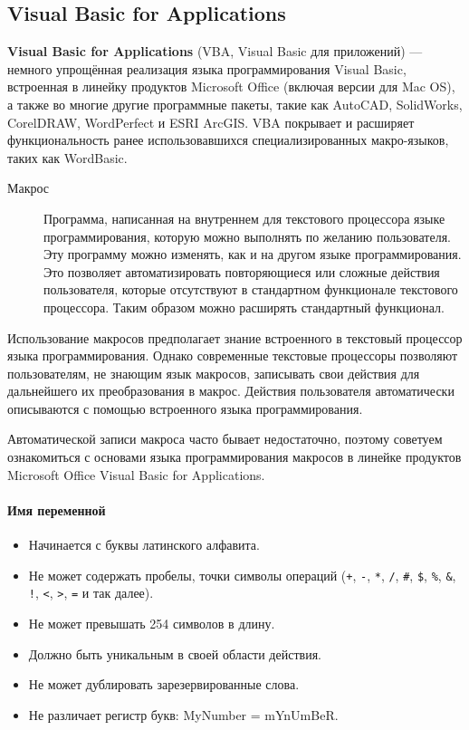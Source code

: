 \subsection{Visual Basic for Applications}\label{subsec:vba}

\textbf{Visual Basic for Applications} (VBA, Visual Basic для приложений) --- немного упрощённая реализация языка программирования Visual Basic, встроенная в линейку продуктов Microsoft Office (включая версии для Mac OS), а также во многие другие программные пакеты, такие как AutoCAD, SolidWorks, CorelDRAW, WordPerfect и ESRI ArcGIS. VBA покрывает и расширяет функциональность ранее использовавшихся специализированных макро-языков, таких как WordBasic.

\begin{description}
    \item [Макрос]
          Программа, написанная на внутреннем для текстового процессора языке программирования, которую можно выполнять по желанию пользователя. Эту программу можно изменять, как и на другом языке программирования. Это позволяет автоматизировать повторяющиеся или сложные действия пользователя, которые отсутствуют в стандартном функционале текстового процессора. Таким образом можно расширять стандартный функционал.
\end{description}

\medskip\noindent
Использование макросов предполагает знание встроенного в текстовый процессор языка программирования. Однако современные текстовые процессоры позволяют пользователям, не знающим язык макросов, записывать свои действия для дальнейшего их преобразования в макрос. Действия пользователя автоматически описываются с помощью встроенного языка программирования.

\medskip\noindent
Автоматической записи макроса часто бывает недостаточно, поэтому советуем ознакомиться с основами языка программирования макросов в линейке продуктов Microsoft Office Visual Basic for Applications.

\paragraph{Имя переменной}
\begin{itemize}
    \item Начинается с буквы латинского алфавита.
    \item Не может содержать пробелы, точки символы операций (\texttt{+}, \texttt{-}, \texttt{*}, \texttt{/}, \texttt{\#}, \texttt{\$}, \texttt{\%}, \texttt{\&}, \texttt{!}, \texttt{<}, \texttt{>}, \texttt{=} и так далее).
    \item Не может превышать 254 символов в длину.
    \item Должно быть уникальным в своей области действия.
    \item Не может дублировать зарезервированные слова.
    \item Не различает регистр букв: MyNumber = mYnUmBeR.
\end{itemize}

